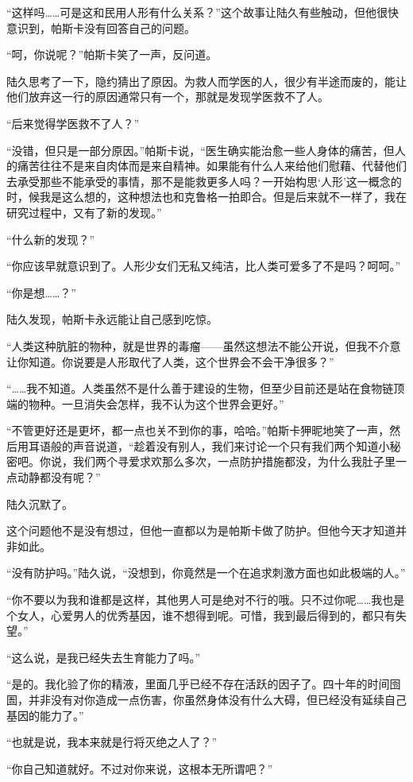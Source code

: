 “这样吗……可是这和民用人形有什么关系？”这个故事让陆久有些触动，但他很快意识到，帕斯卡没有回答自己的问题。

“呵，你说呢？”帕斯卡笑了一声，反问道。

陆久思考了一下，隐约猜出了原因。为救人而学医的人，很少有半途而废的，能让他们放弃这一行的原因通常只有一个，那就是发现学医救不了人。

“后来觉得学医救不了人？”

“没错，但只是一部分原因。”帕斯卡说，“医生确实能治愈一些人身体的痛苦，但人的痛苦往往不是来自肉体而是来自精神。如果能有什么人来给他们慰藉、代替他们去承受那些不能承受的事情，那不是能救更多人吗？一开始构思‘人形’这一概念的时，候我是这么想的，这种想法也和克鲁格一拍即合。但是后来就不一样了，我在研究过程中，又有了新的发现。”

“什么新的发现？”

“你应该早就意识到了。人形少女们无私又纯洁，比人类可爱多了不是吗？呵呵。”

“你是想……？”

陆久发现，帕斯卡永远能让自己感到吃惊。

“人类这种肮脏的物种，就是世界的毒瘤——虽然这想法不能公开说，但我不介意让你知道。你说要是人形取代了人类，这个世界会不会干净很多？”

“……我不知道。人类虽然不是什么善于建设的生物，但至少目前还是站在食物链顶端的物种。一旦消失会怎样，我不认为这个世界会更好。”

“不管更好还是更坏，都一点也关不到你的事，哈哈。”帕斯卡狎昵地笑了一声，然后用耳语般的声音说道，“趁着没有别人，我们来讨论一个只有我们两个知道小秘密吧。你说，我们两个寻爱求欢那么多次，一点防护措施都没，为什么我肚子里一点动静都没有呢？”

陆久沉默了。

这个问题他不是没有想过，但他一直都以为是帕斯卡做了防护。但他今天才知道并非如此。

“没有防护吗。”陆久说，“没想到，你竟然是一个在追求刺激方面也如此极端的人。”

“你不要以为我和谁都是这样，其他男人可是绝对不行的哦。只不过你呢……我也是个女人，心爱男人的优秀基因，谁不想得到呢。可惜，我到最后得到的，都只有失望。”

“这么说，是我已经失去生育能力了吗。”

“是的。我化验了你的精液，里面几乎已经不存在活跃的因子了。四十年的时间囹圄，并非没有对你造成一点伤害，你虽然身体没有什么大碍，但已经没有延续自己基因的能力了。”

“也就是说，我本来就是行将灭绝之人了？”

“你自己知道就好。不过对你来说，这根本无所谓吧？”

